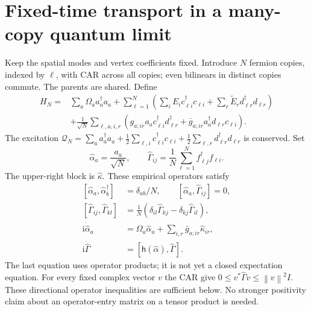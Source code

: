 \documentclass[11pt,a4paper,oneside]{book}
\theoremstyle{plain}
\theoremstyle{definition}
\theoremstyle{remark}
\newcommand{\ii}{\mathrm i}
\newcommand{\norm}[1]{\left\lVert#1\right\rVert}
\newcommand{\src}[2]{\cite{#1}}
\begin{document}
\section{Fixed-time transport in a many-copy quantum limit}
\label{sec:many-copy-transport}
Keep the spatial modes and vertex coefficients fixed.  Introduce $N$
fermion copies, indexed by $\ell$, with CAR across all copies; even
bilinears in distinct copies commute.  The parents are shared.  Define
\begin{equation}
 \begin{split}
 H_N={}&\sum_a\Omega_a a_a^\dagger a_a+
 \sum_{\ell=1}^N\left(\sum_i E_i c_{\ell i}^\dagger c_{\ell i}
                  +\sum_r\widetilde E_r d_{\ell r}^\dagger d_{\ell r}\right)\\
 &+\frac1{\sqrt N}\sum_{\ell,a,i,r}
 \left(g_{a;ir}a_ac_{\ell i}^\dagger d_{\ell r}^\dagger
              +\bar g_{a;ir}a_a^\dagger d_{\ell r}c_{\ell i}\right).
 \end{split}
 \label{eq:many-copy-hamiltonian}
\end{equation}
The excitation
$\mathcal Q_N=\sum_a a_a^\dagger a_a+\tfrac12\sum_{\ell,i}
 c_{\ell i}^\dagger c_{\ell i}+\tfrac12\sum_{\ell,r}
 d_{\ell r}^\dagger d_{\ell r}$ is conserved.  Set
\begin{equation}
 \widehat\alpha_a=\frac{a_a}{\sqrt N},\qquad
 \widehat\Gamma_{ij}=\frac1N\sum_{\ell=1}^N
                         f_{\ell j}^\dagger f_{\ell i}.
 \label{eq:many-copy-empirical-coordinates}
\end{equation}
The upper-right block is $\widehat\kappa$.  These empirical operators
satisfy
\begin{equation}
 \begin{split}
 [\widehat\alpha_a,\widehat\alpha_b^\dagger]&=\delta_{ab}/N,
 \qquad [\widehat\alpha_a,\widehat\Gamma_{ij}]=0,\\
 [\widehat\Gamma_{ij},\widehat\Gamma_{kl}]&=
 \frac1N(\delta_{il}\widehat\Gamma_{kj}
                   -\delta_{kj}\widehat\Gamma_{il}),\\
 \ii\dot{\widehat\alpha}_a&=\Omega_a\widehat\alpha_a+
                            \sum_{i,r}\bar g_{a;ir}\widehat\kappa_{ir},\\
 \ii\dot{\widehat\Gamma}&=
               [\mathsf h(\widehat\alpha),\widehat\Gamma].
 \end{split}
 \label{eq:many-copy-exact-algebra}
\end{equation}
The last equation uses operator products; it is not yet a closed
expectation equation.  For every fixed complex vector $v$ the CAR give
$0\le v^*\widehat\Gamma v\le\norm v^2I$.  These directional operator
inequalities are sufficient below.  No stronger positivity claim about
an operator-entry matrix on a tensor product is needed.
\src{R20}{thm:v20v72-algebra}
\end{document}
